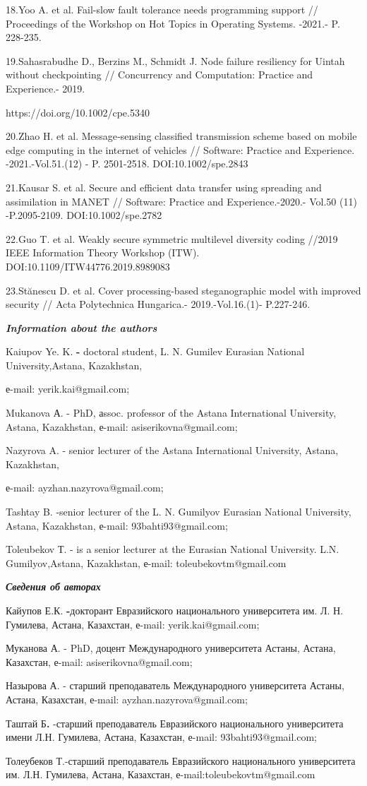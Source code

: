 18.Yoo A. et al. Fail-slow fault tolerance needs programming support //
Proceedings of the Workshop on Hot Topics in Operating Systems. -2021.-
P. 228-235.

19.Sahasrabudhe D., Berzins M., Schmidt J. Node failure resiliency for
Uintah without checkpointing // Concurrency and Computation: Practice
and Experience.- 2019.

https://doi.org/10.1002/cpe.5340

20.Zhao H. et al. Message‐sensing classified transmission scheme based
on mobile edge computing in the internet of vehicles // Software:
Practice and Experience. -2021.-Vol.51.(12) - P. 2501-2518.
DOI:10.1002/spe.2843

21.Kausar S. et al. Secure and efficient data transfer using spreading
and assimilation in MANET // Software: Practice and Experience.-2020.-
Vol.50 (11) -P.2095-2109. DOI:10.1002/spe.2782

22.Guo T. et al. Weakly secure symmetric multilevel diversity coding
//2019 IEEE Information Theory Workshop (ITW).
DOI:10.1109/ITW44776.2019.8989083

23.Stănescu D. et al. Cover processing-based steganographic model with
improved security // Acta Polytechnica Hungarica.- 2019.-Vol.16.(1)-
P.227-246.

\emph{\textbf{Information about the authors}}

Kaiupov Ye. K. \textbf{-} doctoral student, L. N. Gumilev Eurasian
National University,Astana, Kazakhstan,

е-mail: yerik.kai@gmail.com;

Mukanova А. - PhD, аssoc. professor of the Astana International
University, Astana, Kazakhstan, е-mail: asiserikovna@gmail.com;

Nazyrova A. - senior lecturer of the Astana International University,
Astana, Kazakhstan,

е-mail: ayzhan.nazyrova@gmail.com;

Tashtay B. -senior lecturer of the L. N. Gumilyov Eurasian National
University, Astana, Kazakhstan, е-mail: 93bahti93@gmail.com;

Toleubekov Т. - is a senior lecturer at the Eurasian National
University. L.N. Gumilyov,Astana, Kazakhstan, е-mail:
toleubekovtm@gmail.com

\emph{\textbf{Сведения об авторах}}

Кайупов Е.К. \textbf{-}докторант Евразийского национального университета
им. Л. Н. Гумилева, Астана, Казахстан, е-mail: yerik.kai@gmail.com;

Муканова А. - PhD, доцент Международного университета Астаны, Астана,
Казахстан, е-mail: asiserikovna@gmail.com;

Назырова А. - старший преподаватель Международного университета Астаны,
Астана, Казахстан, е-mail: ayzhan.nazyrova@gmail.com;

Таштай Б\textbf{.} -старший преподаватель Евразийского национального
университета имени Л.Н. Гумилева, Астана, Казахстан, е-mail:
93bahti93@gmail.com;

Толеубеков Т.-старший преподаватель Евразийского национального
университета им. Л.Н. Гумилева, Астана, Казахстан,
е-mail:toleubekovtm@gmail.com
